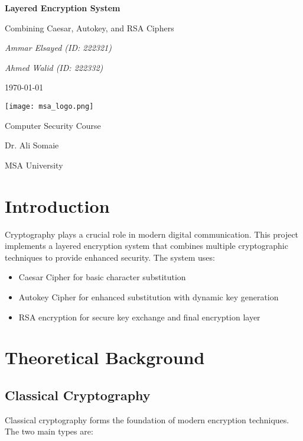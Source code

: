 \documentclass[12pt,a4paper]{article}
\begin{document}
\begin{titlepage}
    \centering
    \vspace*{2cm}
    {\Huge\bfseries Layered Encryption System\par}
    \vspace{1cm}
    {\Large Combining Caesar, Autokey, and RSA Ciphers\par}
    \vspace{2cm}
    {\Large\itshape Ammar Elsayed (ID: 222321)\par}
    {\Large\itshape Ahmed Walid (ID: 222332)\par}
    \vfill
    {\large \today\par}
    \vspace{1cm}
    \texttt{[image: msa\_logo.png]}
    \vfill
    {\large Computer Security Course\par}
    {\large Dr. Ali Somaie\par}
    {\large MSA University\par}
\end{titlepage}

\tableofcontents
\newpage

\section{Introduction}
Cryptography plays a crucial role in modern digital communication. This project implements a layered encryption system that combines multiple cryptographic techniques to provide enhanced security. The system uses:
\begin{itemize}
    \item Caesar Cipher for basic character substitution
    \item Autokey Cipher for enhanced substitution with dynamic key generation
    \item RSA encryption for secure key exchange and final encryption layer
\end{itemize}

\section{Theoretical Background}

\subsection{Classical Cryptography}
Classical cryptography forms the foundation of modern encryption techniques. The two main types are:
\end{document}
